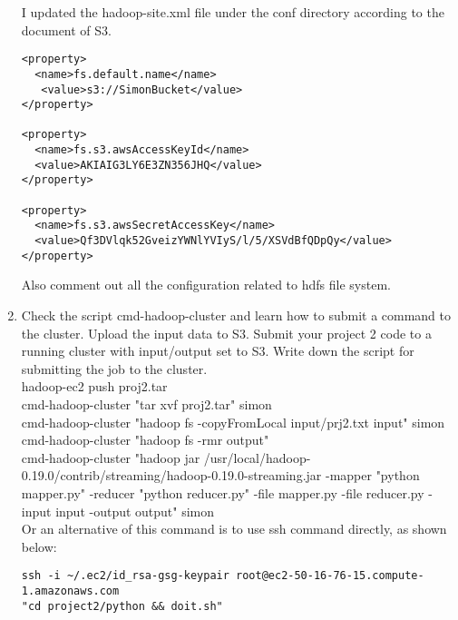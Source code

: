 \documentclass{article}
\begin{document}
\begin{enumerate}
I updated the hadoop-site.xml file under the conf directory according to 
the document of S3. \\

\begin{verbatim}
<property>
  <name>fs.default.name</name>
   <value>s3://SimonBucket</value>
</property>

<property>
  <name>fs.s3.awsAccessKeyId</name>
  <value>AKIAIG3LY6E3ZN356JHQ</value>
</property>

<property>
  <name>fs.s3.awsSecretAccessKey</name>
  <value>Qf3DVlqk52GveizYWNlYVIyS/l/5/XSVdBfQDpQy</value>
</property>
\end{verbatim}

Also comment out all the configuration related to hdfs file system. 

\item Check the script cmd-hadoop-cluster and learn how to submit a command 
to the cluster. Upload the input data to S3. Submit your project 2 code 
to a running cluster with input/output set to S3. Write down the script 
for submitting the job to the cluster. \\

hadoop-ec2 push proj2.tar \\
cmd-hadoop-cluster "tar xvf proj2.tar" simon \\
cmd-hadoop-cluster "hadoop fs -copyFromLocal input/prj2.txt input"
simon \\
cmd-hadoop-cluster "hadoop fs -rmr output" \\
cmd-hadoop-cluster "hadoop jar
/usr/local/hadoop-0.19.0/contrib/streaming/hadoop-0.19.0-streaming.jar
-mapper "python mapper.py" -reducer "python reducer.py" -file
mapper.py -file reducer.py -input input -output output" simon \\

Or an alternative of this command is to use ssh command directly, as
shown below: \\
\begin{verbatim}
ssh -i ~/.ec2/id_rsa-gsg-keypair root@ec2-50-16-76-15.compute-1.amazonaws.com 
"cd project2/python && doit.sh"  
\end{verbatim}
\end{enumerate}
\end{document}

